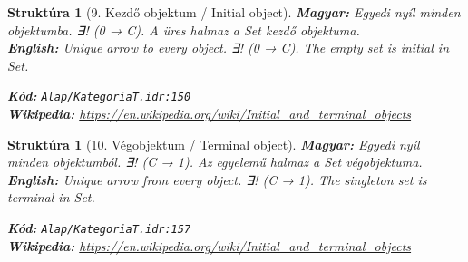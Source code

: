 \documentclass[11pt,a4paper,twocolumn]{article}
\newtheorem{struktura}[tetel]{Struktúra}
\begin{document}
\begin{struktura}[9. Kezdő objektum / Initial object]

\textbf{Magyar:} Egyedi nyíl minden objektumba. ∃! (0 → C). A üres halmaz a Set kezdő objektuma.\\

\textbf{English:} Unique arrow to every object. ∃! (0 → C). The empty set is initial in Set.\\

\begin{center}
\end{center}

\textbf{Kód:} \texttt{Alap/KategoriaT.idr:150}\\
\textbf{Wikipedia:} \url{https://en.wikipedia.org/wiki/Initial_and_terminal_objects}

\end{struktura}

\vspace{0.5cm}

\begin{struktura}[10. Végobjektum / Terminal object]

\textbf{Magyar:} Egyedi nyíl minden objektumból. ∃! (C → 1). Az egyelemű halmaz a Set végobjektuma.\\

\textbf{English:} Unique arrow from every object. ∃! (C → 1). The singleton set is terminal in Set.\\

\begin{center}
\end{center}

\textbf{Kód:} \texttt{Alap/KategoriaT.idr:157}\\
\textbf{Wikipedia:} \url{https://en.wikipedia.org/wiki/Initial_and_terminal_objects}

\end{struktura}

\vspace{0.5cm}
\end{document}
